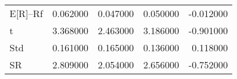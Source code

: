 \begin{tabular}{lrrrr}
\toprule
\midrule
E[R]--Rf & 0.062000 & 0.047000 & 0.050000 & -0.012000 \\
t & 3.368000 & 2.463000 & 3.186000 & -0.901000 \\
Std & 0.161000 & 0.165000 & 0.136000 & 0.118000 \\
SR & 2.809000 & 2.054000 & 2.656000 & -0.752000 \\
\bottomrule
\end{tabular}
